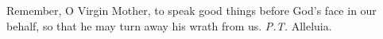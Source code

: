 \begin{enpars}\noindent Remember, O Virgin Mother, to speak good things before God’s face in our behalf, so that he may turn away his wrath from us. \textit{P.T.} Alleluia.
\end{enpars}